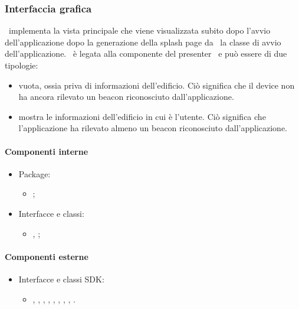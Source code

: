 \documentclass[../Funzionalita.tex]{subfiles}
\begin{document}
		\newpage
		\subsubsection{Interfaccia grafica}
			\HomeViewImp\ implementa la vista principale che viene visualizzata subito dopo l'avvio dell'applicazione dopo la generazione della splash page da \MainActivity\ la classe di avvio dell'applicazione. \HomeView\ è legata alla componente del presenter \HomeActivity\ e può essere di due tipologie:
			\begin{itemize}
				\item vuota, ossia priva di informazioni dell'edificio. Ciò significa che il device non ha ancora rilevato un \gls{beacon} riconosciuto dall'applicazione.
				\item mostra le informazioni dell'edificio in cui è l'utente. Ciò significa che l'applicazione ha rilevato almeno un \gls{beacon} riconosciuto dall'applicazione.
			\end{itemize}
		
			\paragraph*{Componenti interne}
			\begin{itemize}
			
				\item Package:
				\begin{itemize}
					\item[] \view;
				\end{itemize}
				
				\item Interfacce e classi:
				\begin{itemize}
					\item[] \HomeView, \HomeViewImp;
				\end{itemize}
				
			\end{itemize}
			
			\paragraph*{Componenti esterne}
			\begin{itemize}
				\item Interfacce e classi SDK:
				\begin{itemize}
					\item[] \Activity, \Toolbar, \TextView, \DrawerLayout, \TextView, \SearchView, \FloatingActionButton, \ListView, \ActionBarDrawerToggle.
				\end{itemize}
			\end{itemize}
			
\end{document}
